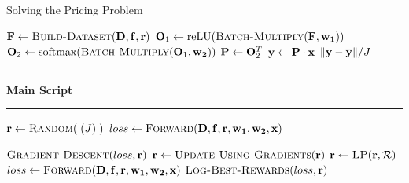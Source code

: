 \begin{algorithm}[!htbp]
    \caption{Solving the Pricing Problem} \label{alg:Solving the Pricing Problem}
    \begin{algorithmic}[1]
            \State $\tens{F} \gets \Call{Build-Dataset}{\matr{D}, \matr{f}, \vect{r}}$
            \State $\matr{O}_1 \gets \text{reLU}(\Call{Batch-Multiply}{\tens{F}, \matr{w_1}})$
            \State $\matr{O}_2 \gets \text{softmax}(\Call{Batch-Multiply}{\matr{O}_1, \matr{w_2}})$
            \State $\mathbf{P} \gets \mathbf{O}_2^T$
            \State $\mathbf{y} \gets \mathbf{P} \cdot \mathbf{x}$
            \State \Return $\lVert \mathbf{y} - \overline{\mathbf{y}} \rVert / J$
        \EndFunction
        \vspace*{-.7\baselineskip}\Statex\hspace*{\dimexpr-\algorithmicindent-2pt\relax}\rule{\textwidth}{0.1pt}%
        \Statex\hspace*{-\algorithmicindent}\textbf{Main Script}%
        \vspace*{-.6\baselineskip}\Statex\hspace*{\dimexpr-\algorithmicindent-2pt\relax}\rule{\textwidth}{0.1pt}%
        \State $\vect{r} \gets \Call{Random}{\;(J)\;}$
        \State $loss \gets \Call{Forward}{\matr{D}, \matr{f}, \vect{r}, \matr{w_1}, \matr{w_2}, \vect{x}}$
            
        \State $\Call{Gradient-Descent}{loss, \vect{r}}$
        \State $\vect{r} \gets \Call{Update-Using-Gradients}{\vect{r}}$
        \State $\vect{r} \gets \Call{LP}{\vect{r}, \mathcal{R}}$
        \State $loss \gets \Call{Forward}{\matr{D}, \matr{f}, \vect{r}, \matr{w_1}, \matr{w_2}, \vect{x}}$
        \State $\Call{Log-Best-Rewards}{loss, \vect{r}}$
        \EndFor
    \end{algorithmic}
\end{algorithm}

